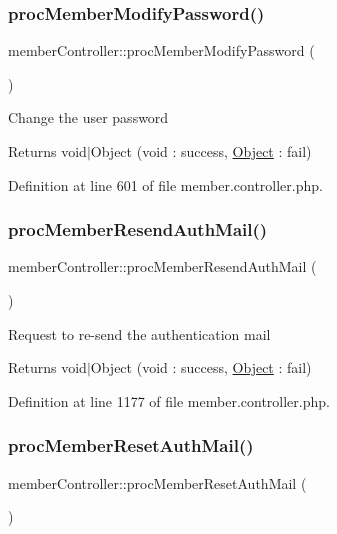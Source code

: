 \subsubsection{\texorpdfstring{proc\+Member\+Modify\+Password()}{procMemberModifyPassword()}}
{\footnotesize\ttfamily member\+Controller\+::proc\+Member\+Modify\+Password (\begin{DoxyParamCaption}{ }\end{DoxyParamCaption})}

Change the user password

\begin{DoxyReturn}{Returns}
void$\vert$\+Object (void \+: success, \hyperlink{classObject}{Object} \+: fail) 
\end{DoxyReturn}


Definition at line 601 of file member.\+controller.\+php.

\hypertarget{classmemberController_aa0e4416a4e98fc31701ba68581b7c14b}{}\label{classmemberController_aa0e4416a4e98fc31701ba68581b7c14b} 
\subsubsection{\texorpdfstring{proc\+Member\+Resend\+Auth\+Mail()}{procMemberResendAuthMail()}}
{\footnotesize\ttfamily member\+Controller\+::proc\+Member\+Resend\+Auth\+Mail (\begin{DoxyParamCaption}{ }\end{DoxyParamCaption})}

Request to re-\/send the authentication mail

\begin{DoxyReturn}{Returns}
void$\vert$\+Object (void \+: success, \hyperlink{classObject}{Object} \+: fail) 
\end{DoxyReturn}


Definition at line 1177 of file member.\+controller.\+php.

\hypertarget{classmemberController_ab0515bd2aae55dbda2049d39612ef6b2}{}\label{classmemberController_ab0515bd2aae55dbda2049d39612ef6b2} 
\subsubsection{\texorpdfstring{proc\+Member\+Reset\+Auth\+Mail()}{procMemberResetAuthMail()}}
{\footnotesize\ttfamily member\+Controller\+::proc\+Member\+Reset\+Auth\+Mail (\begin{DoxyParamCaption}{ }\end{DoxyParamCaption})}



